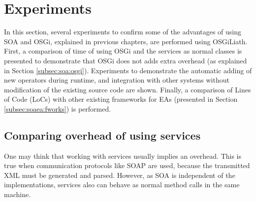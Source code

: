 \section{Experiments} %
\label{sec:osgiliath:experiments}
In this section, several experiments to confirm some of the advantages of using SOA and OSGi, explained in previous chapters, are performed using OSGiLiath. First, a comparison of time of using OSGi and the services as normal classes is presented to demonstrate that OSGi does not adds extra overhead (as explained in Section \ref{subsec:soa:osgi}). Experiments to demonstrate the automatic adding of new operators during runtime, and integration with other systems without modification of the existing source code are shown. Finally, a comparison of Lines of Code (LoCs) with other existing frameworks for EAs (presented in Section \ref{subsec:soaea:fworks}) is performed.

\subsection{Comparing overhead of using services}
\label{subsec:osgiliath:comparingoverhead}
One may think that working with services usually implies an
overhead. This is true when communication protocols like SOAP are
used, because the transmitted XML must be generated and
parsed. However, as SOA is independent of the implementations,
services also can behave as normal method calls in the same machine. 


